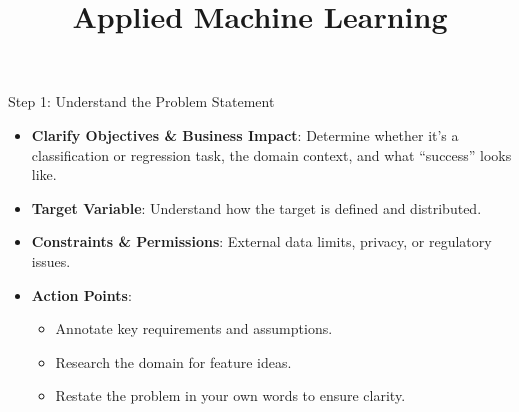 \documentclass[10pt,compress,t,notes=noshow, xcolor=table]{beamer}
\begin{document}
\title{Applied Machine Learning}



\begin{frame}{Step 1: Understand the Problem Statement}
\begin{itemize}
  \item \textbf{Clarify Objectives \& Business Impact}: Determine whether it's a classification or regression task, the domain context, and what “success” looks like.
  \item \textbf{Target Variable}: Understand how the target is defined and distributed.
  \item \textbf{Constraints \& Permissions}: External data limits, privacy, or regulatory issues.
  \item \textbf{Action Points}:
    \begin{itemize}
      \item Annotate key requirements and assumptions.
      \item Research the domain for feature ideas.
      \item Restate the problem in your own words to ensure clarity.
    \end{itemize}
\end{itemize}
\end{frame}
\end{document}
